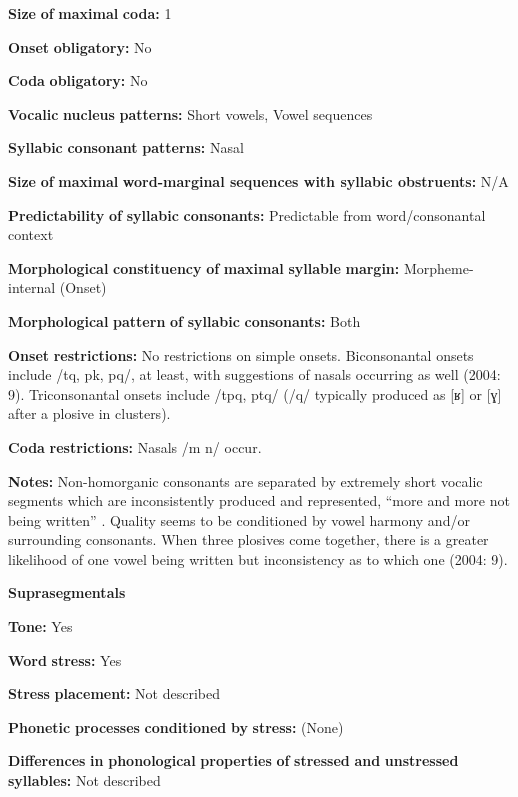 \begin{styleBody}
\textbf{Size} \textbf{of} \textbf{maximal} \textbf{coda:} 1

\textbf{Onset} \textbf{obligatory:} No

\textbf{Coda} \textbf{obligatory:} No

\textbf{Vocalic} \textbf{nucleus} \textbf{patterns:} Short vowels, Vowel sequences

\textbf{Syllabic} \textbf{consonant} \textbf{patterns:} Nasal

\textbf{Size} \textbf{of} \textbf{maximal} \textbf{word{}-marginal sequences with syllabic obstruents:} N/A

\textbf{Predictability} \textbf{of} \textbf{syllabic} \textbf{consonants:} Predictable from word/consonantal context

\textbf{Morphological} \textbf{constituency} \textbf{of} \textbf{maximal} \textbf{syllable} \textbf{margin:} Morpheme-internal (Onset)

\textbf{Morphological} \textbf{pattern} \textbf{of} \textbf{syllabic} \textbf{consonants:} Both

\textbf{Onset} \textbf{restrictions:} No restrictions on simple onsets. Biconsonantal onsets include /tq, pk, pq/, at least, with suggestions of nasals occurring as well (2004: 9). Triconsonantal onsets include /tpq, ptq/ (/q/ typically produced as [ʁ] or [ɣ] after a plosive in clusters). 

\textbf{Coda} \textbf{restrictions:} Nasals /m n/ occur.

\textbf{Notes:} Non-homorganic consonants are separated by extremely short vocalic segments which are inconsistently produced and represented, “more and more not being written” \citep[226]{Whitehead2004}. Quality seems to be conditioned by vowel harmony and/or surrounding consonants. When three plosives come together, there is a greater likelihood of one vowel being written but inconsistency as to which one (2004: 9).

\textbf{Suprasegmentals}

\textbf{Tone:} Yes

\textbf{Word} \textbf{stress:} Yes

\textbf{Stress} \textbf{placement:} Not described

\textbf{Phonetic} \textbf{processes} \textbf{conditioned} \textbf{by} \textbf{stress:} (None)

\textbf{Differences} \textbf{in} \textbf{phonological} \textbf{properties} \textbf{of} \textbf{stressed} \textbf{and} \textbf{unstressed} \textbf{syllables:} Not described


\end{styleBody}
